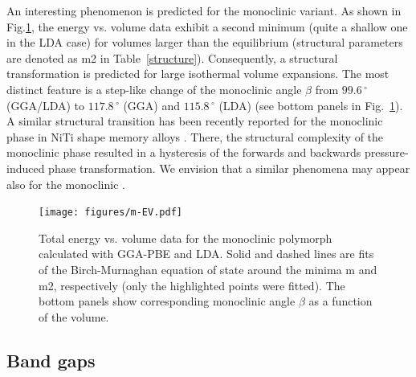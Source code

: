 \documentclass[10pt,a4paper,twocolumn]{article}
\begin{document}
An interesting phenomenon is predicted for the monoclinic variant.
As shown in Fig.\ref{EV}, the energy vs. volume data exhibit a second minimum (quite a shallow one in the LDA case) for volumes larger than the equilibrium (structural parameters are denoted as m2 in Table~\ref{structure}).
Consequently, a structural transformation is predicted for large isothermal volume expansions.
The most distinct feature is a step-like change of the monoclinic angle $\beta$ from $99.6\,^\circ$ (GGA/LDA) to $117.8\,^\circ$ (GGA) and $115.8\,^\circ$ (LDA) (see bottom panels in Fig.~\ref{EV}).
A similar structural transition has been recently reported for the monoclinic phase in NiTi shape memory alloys \cite{Holec2011-tg}.
There, the structural complexity of the monoclinic phase resulted in a hysteresis of the forwards and backwards pressure-induced phase transformation.
We envision that a similar phenomena may appear also for the monoclinic .

\begin{figure}
\begin{center}
	\texttt{[image: figures/m-EV.pdf]}
	\caption{Total energy vs. volume data for the monoclinic polymorph calculated with GGA-PBE and LDA. Solid and dashed lines are fits of the Birch-Murnaghan equation of state around the minima m and m2, respectively (only the highlighted points were fitted). The bottom panels show corresponding  monoclinic angle $\beta$ as a function of the volume.}
   \label{EV}
\end{center}
\end{figure}

\subsection{Band gaps}
\end{document}
